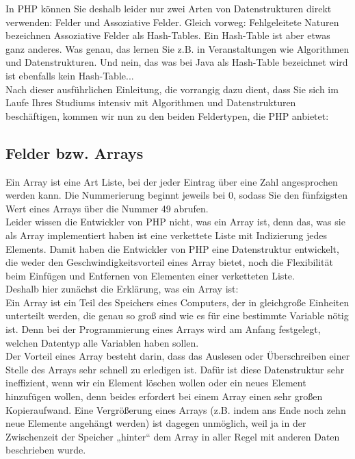 In PHP können Sie deshalb leider nur zwei Arten von Datenstrukturen direkt verwenden: Felder und Assoziative Felder. Gleich vorweg: Fehlgeleitete Naturen bezeichnen Assoziative Felder als Hash-Tables. Ein Hash-Table ist aber etwas ganz anderes. Was genau, das lernen Sie z.B. in Veranstaltungen wie Algorithmen und Datenstrukturen. Und nein, das was bei Java als Hash-Table bezeichnet wird ist ebenfalls kein Hash-Table...\\

Nach dieser ausführlichen Einleitung, die vorrangig dazu dient, dass Sie sich im Laufe Ihres Studiums intensiv mit Algorithmen und Datenstrukturen beschäftigen, kommen wir nun zu den beiden Feldertypen, die PHP anbietet:

\subsection{Felder bzw. Arrays}

Ein Array ist eine Art Liste, bei der jeder Eintrag über eine Zahl angesprochen werden kann. Die Nummerierung beginnt jeweils bei 0, sodass Sie den fünfzigsten Wert eines Arrays über die Nummer 49 abrufen.\\

Leider wissen die Entwickler von PHP nicht, was ein Array ist, denn das, was sie als Array implementiert haben ist eine verkettete Liste mit Indizierung jedes Elements. Damit haben die Entwickler von PHP eine Datenstruktur entwickelt, die weder den Geschwindigkeitsvorteil eines Array bietet, noch die Flexibilität beim Einfügen und Entfernen von Elementen einer verketteten Liste.\\

Deshalb hier zunächst die Erklärung, was ein Array ist:\\

Ein Array ist ein Teil des Speichers eines Computers, der in gleichgroße Einheiten unterteilt werden, die genau so groß sind wie es für eine bestimmte Variable nötig ist. Denn bei der Programmierung eines Arrays wird am Anfang festgelegt, welchen Datentyp alle Variablen haben sollen. \\

Der Vorteil eines Array besteht darin, dass das Auslesen oder Überschreiben einer Stelle des Arrays sehr schnell zu erledigen ist. Dafür ist diese Datenstruktur sehr ineffizient, wenn wir ein Element löschen wollen oder ein neues Element hinzufügen wollen, denn beides erfordert bei einem Array einen sehr großen Kopieraufwand. Eine Vergrößerung eines Arrays (z.B. indem ans Ende noch zehn neue Elemente angehängt werden) ist dagegen unmöglich, weil ja in der Zwischenzeit der Speicher „hinter“ dem Array in aller Regel mit anderen Daten beschrieben wurde. \\

